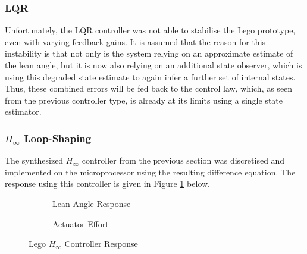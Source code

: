 \subsubsection{LQR}
Unfortunately, the LQR controller was not able to stabilise the Lego prototype, even with varying feedback gains. It is assumed that the reason for this instability is that not only is the system relying on an approximate estimate of the lean angle, but it is now also relying on an additional state observer, which is using this degraded state estimate to again infer a further set of internal states. Thus, these combined errors will be fed back to the control law, which, as seen from the previous controller type, is already at its limits using a single state estimator.

\subsubsection{$H_{\infty}$ Loop-Shaping}
The synthesized $H_{\infty}$ controller from the previous section was discretised and implemented on the microprocessor using the resulting difference equation. The response using this controller is given in Figure \ref{fig:LegoHInfController} below.

\begin{figure}[H]
	\begin{subfigure}{0.5\textwidth}
	\caption{Lean Angle Response}
	\end{subfigure} \hspace{1mm}
	\begin{subfigure}{0.5\textwidth}
	\caption{Actuator Effort}
	\end{subfigure}
	\caption{Lego $H_{\infty}$ Controller Response}
	\label{fig:LegoHInfController}
\end{figure}

